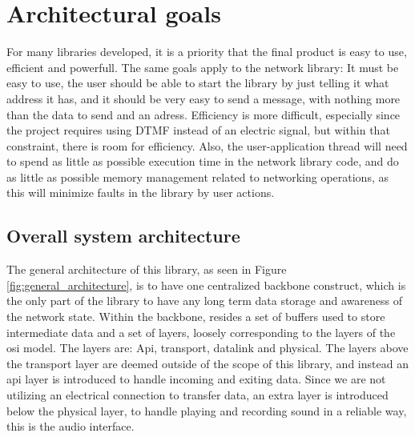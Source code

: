 \section{Architectural goals}
For many libraries developed, it is a priority that the final product is easy to use, efficient and powerfull.  The same goals apply to the network library: It must be easy to use, the user should be able to start the library by just telling it what address it has, and it should be very easy to send a message, with nothing more than the data to send and an adress. Efficiency is more difficult, especially since the project requires using DTMF instead of an electric signal, but within that constraint, there is room for efficiency.
Also, the user-application thread will need to spend as little as possible execution time in the network library code, and do as little as possible memory management related to networking operations, as this will minimize faults in the library by user actions.



\subsection{Overall system architecture}
The general architecture of this library, as seen in Figure \ref{fig:general_architecture}, is to have one centralized backbone construct, which is the only part of the library to have any long term data storage and awareness of the network state. 
Within the backbone, resides a set of buffers used to store intermediate data and a set of layers, loosely corresponding to the layers of the osi model.
The layers are: Api, transport, datalink and physical.
The layers above the transport layer are deemed outside of the scope of this library, and instead an api layer is introduced to handle incoming and exiting data. Since we are not utilizing an electrical connection to transfer data, an extra layer is introduced below the physical layer, to handle playing and recording sound in a reliable way, this is the audio interface.









